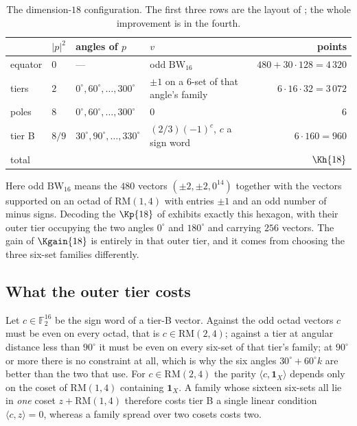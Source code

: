 \documentclass[11pt]{amsart}
\theoremstyle{remark}
\newcommand{\ip}[2]{\langle #1,#2\rangle}
\begin{document}
\begin{table}[ht]
\caption{The dimension-$18$ configuration. The first three rows are the layout of
\cite{cohn-li2024}; the whole improvement is in the fourth.}
\label{tab:d18}
\small
\begin{tabular}{llll r}
\toprule
 & $|p|^{2}$ & angles of $p$ & $v$ & points\\
\midrule
equator & $0$ & --- & odd $\mathrm{BW}_{16}$ & $480+30\cdot128=4\,320$\\
tiers & $2$ & $0^\circ,60^\circ,\dots,300^\circ$ & $\pm1$ on a $6$-set of that angle's family & $6\cdot16\cdot32=3\,072$\\
poles & $8$ & $0^\circ,60^\circ,\dots,300^\circ$ & $0$ & $6$\\
tier B & $8/9$ & $30^\circ,90^\circ,\dots,330^\circ$ & $(2/3)(-1)^{c}$, $c$ a sign word & $6\cdot160=960$\\
\midrule
total & & & & $\Kh{18}$\\
\bottomrule
\end{tabular}
\end{table}

Here odd $\mathrm{BW}_{16}$ means the $480$ vectors $(\pm2,\pm2,0^{14})$ together
with the vectors supported on an octad of $\mathrm{RM}(1,4)$ with entries $\pm1$
and an odd number of minus signs. Decoding the $\Kp{18}$ of \cite{cohn-li2024}
exhibits exactly this hexagon, with their outer tier occupying the two angles
$0^\circ$ and $180^\circ$ and carrying $256$ vectors. The gain of $\Kgain{18}$ is
entirely in that outer tier, and it comes from choosing the three six-set
families differently.

\subsection{What the outer tier costs}

Let $c\in\mathbb F_2^{16}$ be the sign word of a tier-B vector. Against the odd
octad vectors $c$ must be even on every octad, that is $c\in\mathrm{RM}(2,4)$;
against a tier at angular distance less than $90^\circ$ it must be even on every
six-set of that tier's family; at $90^\circ$ or more there is no constraint at
all, which is why the six angles $30^\circ+60^\circ k$ are better than the two
that \cite{cohn-li2024} use. For $c\in\mathrm{RM}(2,4)$ the parity
$\ip{c}{\mathbf 1_X}$ depends only on the coset of $\mathrm{RM}(1,4)$ containing
$\mathbf 1_X$. A family whose sixteen six-sets all lie in \emph{one} coset
$z+\mathrm{RM}(1,4)$ therefore costs tier B a single linear condition
$\ip{c}{z}=0$, whereas a family spread over two cosets costs two.
\end{document}
